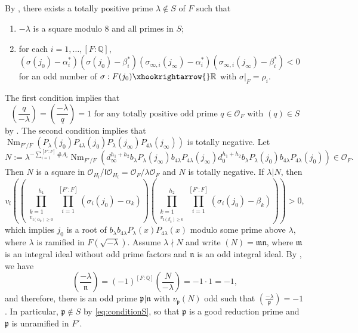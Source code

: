 \documentclass{amsart}
\numberwithin{equation}{subsection}
\numberwithin{theorem}{section}
\theoremstyle{definition}
\theoremstyle{remark}
\newcommand{\bQ}{\mathbb{Q}}
\newcommand{\bR}{\mathbb{R}}
\newcommand{\cO}{\mathcal{O}}
\newcommand{\fp}{\mathfrak{p}}
\DeclareMathOperator{\Nm}{Nm}
\begin{document}
\subsection{} \label{sec:main4}
By , there exists a totally positive prime $\lambda \notin S$ of $F$ such that \begin{enumerate}
    \item $-\lambda$ is a square modulo $8$ and all primes in $S$;
    \item for each $i=1, \dotsc, [F:\bQ]$, $(\sigma(j_0) - \alpha_{i}^*)(\sigma(j_0)- \beta_i^*) (\sigma_{\infty,i}(j_\infty) - \alpha_{i}^*)(\sigma_{\infty,i}(j_\infty)- \beta_i^*)<0 $ for an odd number of $\sigma:F(j_0)\xhookrightarrow{}\bR$ with $\sigma|_F = \rho_i$.
\end{enumerate}
The first condition implies that 
\begin{equation} \label{eq:conditionS}
    \left(\frac{q}{-\lambda}\right) = \left(\frac{-\lambda}{q}\right)=1 \text{ for any totally positive odd prime } q\in \cO_F \text{ with } (q) \in S
\end{equation} by . The second condition implies that $\Nm_{F'/F}(P_{\lambda}(j_0)P_{4\lambda}(j_0)P_{\lambda}(j_\infty)P_{4\lambda}(j_{\infty}))$ is totally negative. Let \[N:= \lambda^{-\sum_{i=1}^{[F':F]}\#A_i}\Nm_{F'/F}(d_{\infty}^{h_1+h_2} b_{\lambda} P_{\lambda}(j_{\infty}) b_{4\lambda} P_{4\lambda}(j_{\infty})d_{0}^{h_1+h_2} b_{\lambda} P_{\lambda}(j_{0}) b_{4\lambda} P_{4\lambda}(j_0))\in \cO_F.\] Then $N$ is a square in  $\cO_{H_{\mathfrak{l}}}/\mathfrak{l}\cO_{H_{\mathfrak{l}}} = \cO_F/\lambda \cO_F$ and $N$ is totally negative. If $\lambda | N$, then \[v_{\mathfrak{l}}\left(\left(\prod_{\substack{k=1 \\ v_{\mathfrak{l}(\alpha_k)\geq 0}}}^{h_1} \prod_{i=1}^{[F':F]} (\sigma_i(j_0)-\alpha_k)\right)\left(\prod_{\substack{k=1 \\ v_{\mathfrak{l}(\beta_k)\geq 0}}}^{h_2} \prod_{i=1}^{[F':F]} (\sigma_i(j_0)-\beta_k)\right)\right)>0, \] which implies $j_0$ is a root of $b_{\lambda}b_{4\lambda} P_{\lambda}(x)P_{4\lambda}(x)$ modulo some prime above $\lambda$, where $\lambda$ is ramified in $F(\sqrt{-\lambda})$. Assume $\lambda \nmid N$ and write $(N) = \mathfrak{m}\mathfrak{n}$, where  $\mathfrak{m}$ is an integral ideal without odd prime factors and $\mathfrak{n}$ is an odd integral ideal. 
By , we have \[ \left(\frac{-\lambda}{\mathfrak{n}}\right) = (-1)^{[F:\bQ]} \left(\frac{N}{-\lambda}\right) = -1 \cdot 1 = -1,\]
and therefore, there is an odd prime $\fp| \mathfrak{n}$ with $v_\fp(N)$ odd such that $\left(\frac{-\lambda}{\fp}\right) = -1$. In particular, $\fp \notin S$ by \eqref{eq:conditionS}, so that $\fp$ is a good reduction prime and $\fp$ is unramified  in $F'$. 
\end{document}
